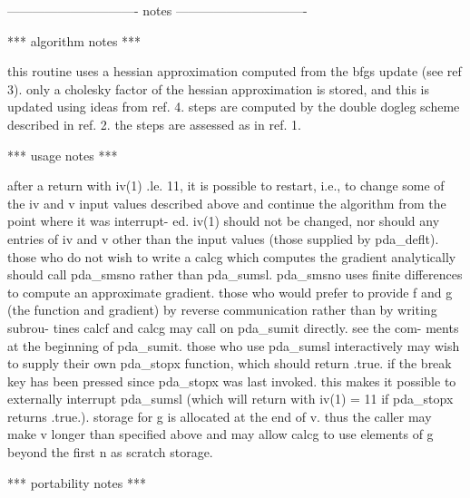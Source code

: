 \documentclass[11pt,twoside,nolof]{starlink}
\begin{document}
\begin{terminalv}
 -------------------------------  notes  -------------------------------

   ***  algorithm notes  ***

         this routine uses a hessian approximation computed from the
      bfgs update (see ref 3).  only a cholesky factor of the hessian
      approximation is stored, and this is updated using ideas from
      ref. 4.  steps are computed by the double dogleg scheme described
      in ref. 2.  the steps are assessed as in ref. 1.

   ***  usage notes  ***

         after a return with iv(1) .le. 11, it is possible to restart,
      i.e., to change some of the iv and v input values described above
      and continue the algorithm from the point where it was interrupt-
      ed.  iv(1) should not be changed, nor should any entries of iv
      and v other than the input values (those supplied by pda_deflt).
         those who do not wish to write a calcg which computes the
      gradient analytically should call pda_smsno rather than pda_sumsl.
      pda_smsno uses finite differences to compute an approximate gradient.
         those who would prefer to provide f and g (the function and
      gradient) by reverse communication rather than by writing subrou-
      tines calcf and calcg may call on pda_sumit directly.  see the com-
      ments at the beginning of pda_sumit.
         those who use pda_sumsl interactively may wish to supply their
      own pda_stopx function, which should return .true. if the break key
      has been pressed since pda_stopx was last invoked.  this makes it
      possible to externally interrupt pda_sumsl (which will return with
      iv(1) = 11 if pda_stopx returns .true.).
         storage for g is allocated at the end of v.  thus the caller
      may make v longer than specified above and may allow calcg to use
      elements of g beyond the first n as scratch storage.

   ***  portability notes  ***


\end{terminalv}
\end{document}
